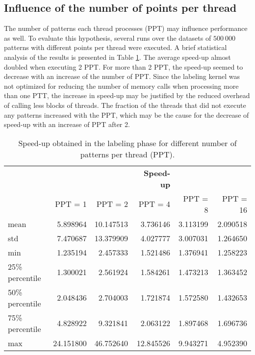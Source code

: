 \subsection{Influence of the number of points per thread}

The number of patterns each thread processes (PPT) may influence performance as well.
To evaluate this hypothesis, several runs over the datasets of $500 \: 000$ patterns with different points per thread were executed.
A brief statistical analysis of the results is presented in Table \ref{tab:kmeans cuda ppt}.
The average speed-up almost doubled when executing 2 PPT.
For more than 2 PPT, the speed-up seemed to decrease with an increase of the number of PPT.
Since the labeling kernel was not optimized for reducing the number of memory calls when processing more than one PTT, the increase in speed-up may be justified by the reduced overhead of calling less blocks of threads.
The fraction of the threads that did not execute any patterns increased with the PPT, which may be the cause for the decrease of speed-up with an increase of PPT after 2.

\begin{table}[h]
\centering
\caption{Speed-up obtained in the labeling phase for different number of patterns per thread (PPT).}


\begin{tabular}{lrrrrr}
\toprule
{} &       {} 	   &   {} 		   &  \textbf{Speed-up}  & {} 		& {}\\
{} &       PPT = 1 &       PPT = 2 &       PPT = 4 &       PPT = 8 &      PPT = 16 \\
\midrule
mean  &   5.898964 &  10.147513 &   3.736146 &   3.113199 &   2.090518 \\
std   &   7.470687 &  13.379909 &   4.027777 &   3.007031 &   1.264650 \\
min   &   1.235194 &   2.457333 &   1.521486 &   1.376941 &   1.258223 \\
25\% percentile  &   1.300021 &   2.561924 &   1.584261 &   1.473213 &   1.363452 \\
50\% percentile  &   2.048436 &   2.704003 &   1.721874 &   1.572580 &   1.432653 \\
75\% percentile  &   4.828922 &   9.321841 &   2.063122 &   1.897468 &   1.696736 \\
max   &  24.151800 &  46.752640 &  12.845526 &   9.943271 &   4.952390 \\
\bottomrule
\end{tabular}

\label{tab:kmeans cuda ppt}
\end{table}